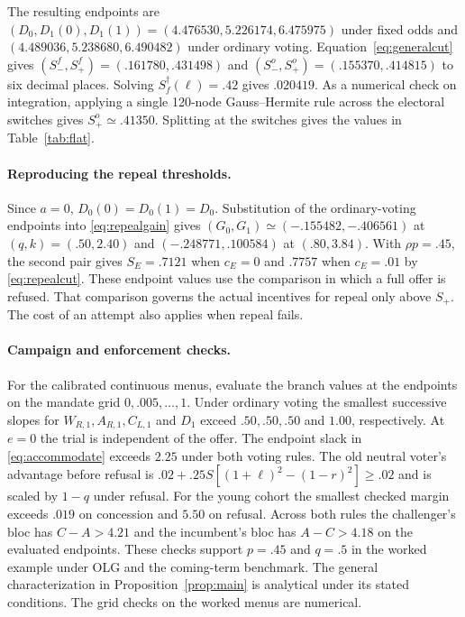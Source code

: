 \documentclass[11pt,letterpaper]{article}
\begin{document}
The resulting endpoints are $(D_0,D_1(0),D_1(1))=(4.476530,5.226174,6.475975)$ under fixed odds and $(4.489036,5.238680,6.490482)$ under ordinary voting. Equation~\eqref{eq:generalcut} gives $(S_-^f,S_+^f)=(.161780,.431498)$ and $(S_-^o,S_+^o)=(.155370,.414815)$ to six decimal places. Solving $S_f^\dagger(\ell)=.42$ gives $.020419$. As a numerical check on integration, applying a single 120-node Gauss--Hermite rule across the electoral switches gives $S_+^o\simeq .41350$. Splitting at the switches gives the values in Table~\ref{tab:flat}.

\paragraph{Reproducing the repeal thresholds.}
Since $a=0$, $D_0(0)=D_0(1)=D_0$. Substitution of the ordinary-voting endpoints into \eqref{eq:repealgain} gives $(G_0,G_1)\simeq(-.155482,-.406561)$ at $(q,k)=(.50,2.40)$ and $(-.248771,.100584)$ at $(.80,3.84)$. With $\rho p=.45$, the second pair gives $S_E=.7121$ when $c_E=0$ and $.7757$ when $c_E=.01$ by \eqref{eq:repealcut}. These endpoint values use the comparison in which a full offer is refused. That comparison governs the actual incentives for repeal only above $S_+$. The cost of an attempt also applies when repeal fails.

\paragraph{Campaign and enforcement checks.}
For the calibrated continuous menus, evaluate the branch values at the endpoints on the mandate grid $0,.005,\ldots,1$. Under ordinary voting the smallest successive slopes for $W_{R,1},A_{R,1},C_{L,1}$ and $D_1$ exceed $.50,.50,.50$ and $1.00$, respectively. At $e=0$ the trial is independent of the offer. The endpoint slack in \eqref{eq:accommodate} exceeds $2.25$ under both voting rules. The old neutral voter's advantage before refusal is $.02+.25S[(1+\ell)^2-(1-r)^2]\ge.02$ and is scaled by $1-q$ under refusal. For the young cohort the smallest checked margin exceeds $.019$ on concession and $5.50$ on refusal. Across both rules the challenger's bloc has $C-A>4.21$ and the incumbent's bloc has $A-C>4.18$ on the evaluated endpoints. These checks support $p=.45$ and $q=.5$ in the worked example under OLG and the coming-term benchmark. The general characterization in Proposition~\ref{prop:main} is analytical under its stated conditions. The grid checks on the worked menus are numerical.
\end{document}
